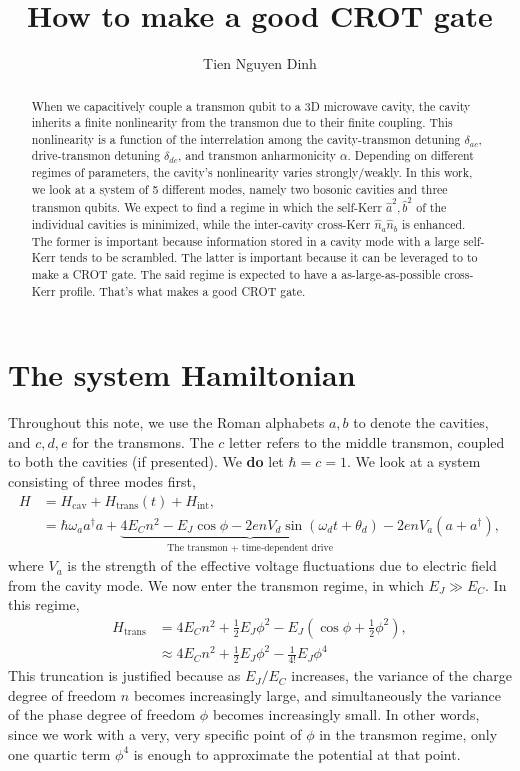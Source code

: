 \documentclass{article}
\title{How to make a good CROT gate}
\author{Tien Nguyen Dinh}
\begin{document}
\maketitle

\begin{abstract}
When we capacitively couple a transmon qubit to a 3D microwave cavity, the cavity inherits a finite nonlinearity from the transmon due to their finite coupling. This nonlinearity is a function of the interrelation among the cavity-transmon detuning $\delta_{ac}$, drive-transmon detuning $\delta_{dc}$, and transmon anharmonicity $\alpha$. Depending on different regimes of parameters, the cavity's nonlinearity varies strongly/weakly. In this work, we look at a system of 5 different modes, namely two bosonic cavities and three transmon qubits. We expect to find a regime in which the self-Kerr $\hat{a}^2, \hat{b}^2$ of the individual cavities is minimized, while the inter-cavity cross-Kerr $\hat{n}_a\hat{n}_b$ is enhanced. The former is important because information stored in a cavity mode with a large self-Kerr tends to be scrambled. The latter is important because it can be leveraged to to make a CROT gate. The said regime is expected to have a as-large-as-possible cross-Kerr profile. That's what makes a good CROT gate.
\end{abstract}

\section{The system Hamiltonian}

Throughout this note, we use the Roman alphabets $a, b$ to denote the cavities, and $c, d, e$ for the transmons. The $c$ letter refers to the middle transmon, coupled to both the cavities (if presented). We \textbf{do} let $\hbar=c=1$. 
We look at a system consisting of three modes first,
\begin{align}
    H &= H_{\text{cav}} + H_{\text{trans}}(t) + H_{\text{int}},\\
    &= \hbar\omega_a a^\dagger a + \underbrace{4E_Cn^2 - E_J\cos\phi -2enV_d\sin(\omega_d t+\theta_d)}_{\text{The transmon + time-dependent drive}} -2enV_a(a+a^\dagger),
\end{align}
where $V_a$ is the strength of the effective voltage fluctuations due to electric field from the cavity mode. We now enter the transmon regime, in which $E_J\gg E_C$. In this regime,
\begin{align}
    H_{\text{trans}} &= 4E_Cn^2 + \frac{1}{2}E_J\phi^2 - E_J(\cos\phi + \frac{1}{2}\phi^2),\\
    &\approx 4E_Cn^2 + \frac{1}{2}E_J\phi^2 - \frac{1}{4!}E_J\phi^4
\end{align}
This truncation is justified because as $E_J/E_C$ increases, the variance of the charge degree of freedom $n$ becomes increasingly large, and simultaneously the variance of the phase degree of freedom $\phi$ becomes increasingly small. In other words, since we work with a very, very specific point of $\phi$ in the transmon regime, only one quartic term $\phi^4$ is enough to approximate the potential at that point. 
\end{document}
